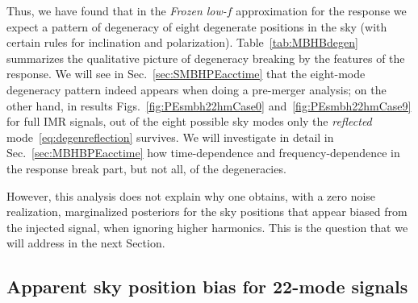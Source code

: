 \documentclass[aps,showpacs,twocolumn,prd,superscriptaddress,nofootinbib]{revtex4-1}
\begin{document}
Thus, we have found that in the \textit{Frozen low-$f$} approximation for the response we expect a pattern of degeneracy of eight degenerate positions in the sky (with certain rules for inclination and polarization). Table~\ref{tab:MBHBdegen} summarizes the qualitative picture of degeneracy breaking by the features of the response. We will see in Sec.~\ref{sec:SMBHPEacctime} that the eight-mode degeneracy pattern indeed appears when doing a pre-merger analysis; on the other hand, in results Figs.~\ref{fig:PEsmbh22hmCase0} and~\ref{fig:PEsmbh22hmCase9} for full IMR signals, out of the eight possible sky modes only the \textit{reflected} mode~\eqref{eq:degenreflection} survives. We will investigate in detail in Sec.~\ref{sec:MBHBPEacctime} how time-dependence and frequency-dependence in the response break part, but not all, of the degeneracies.

However, this analysis does not explain why one obtains, with a zero noise realization, marginalized posteriors for the sky positions that appear biased from the injected signal, when ignoring higher harmonics. This is the question that we will address in the next Section.


\subsection{Apparent sky position bias for 22-mode signals}
\label{subsec:MBHBPEdegen22}
\end{document}
